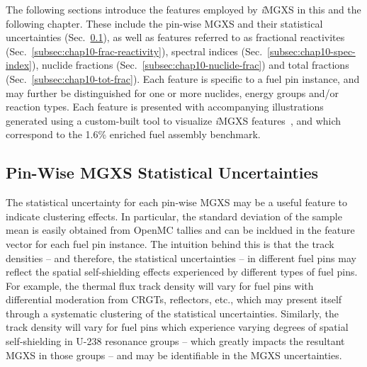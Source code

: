The following sections introduce the features employed by \textit{i}\ac{MGXS} in this and the following chapter. These include the pin-wise \ac{MGXS} and their statistical uncertainties (Sec.~\ref{subsec:chap10-stat-uncertainty}), as well as features referred to as fractional reactivites (Sec.~\ref{subsec:chap10-frac-reactivity}), spectral indices (Sec.~\ref{subsec:chap10-spec-index}), nuclide fractions (Sec.~\ref{subsec:chap10-nuclide-frac}) and total fractions (Sec.~\ref{subsec:chap10-tot-frac}). Each feature is specific to a fuel pin instance, and may further be distinguished for one or more nuclides, energy groups and/or reaction types. Each feature is presented with accompanying illustrations generated using a custom-built tool to visualize \textit{i}\ac{MGXS} features~\cite{abel2016bokeh}, and which correspond to the 1.6\% enriched fuel assembly benchmark.




\subsection{Pin-Wise MGXS Statistical Uncertainties}
\label{subsec:chap10-stat-uncertainty}

The statistical uncertainty for each pin-wise \ac{MGXS} may be a useful feature to indicate clustering effects. In particular, the standard deviation of the sample mean is easily obtained from OpenMC tallies and can be incldued in the feature vector for each fuel pin instance. The intuition behind this is that the track densities -- and therefore, the statistical uncertainties -- in different fuel pins may reflect the spatial self-shielding effects experienced by different types of fuel pins. For example, the thermal flux track density will vary for fuel pins with differential moderation from \acp{CRGT}, reflectors, etc., which may present itself through a systematic clustering of the statistical uncertainties. Similarly, the track density will vary for fuel pins which experience varying degrees of spatial self-shielding in U-238 resonance groups -- which greatly impacts the resultant \ac{MGXS} in those groups -- and may be identifiable in the \ac{MGXS} uncertainties.

